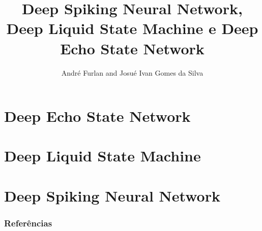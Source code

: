 

\title{Deep Spiking Neural Network, Deep Liquid	State Machine e Deep Echo State Network}


\author{André Furlan and Josué Ivan Gomes da Silva}

\date{\the\year}


	
	\frame{\titlepage}
	
	\section{Deep Echo State Network}
		
	\section{Deep Liquid State Machine}
		
	\section{Deep Spiking Neural Network}
		
	
	\begin{frame}[allowframebreaks]
		\frametitle{Referências}
		
	\end{frame}
	
